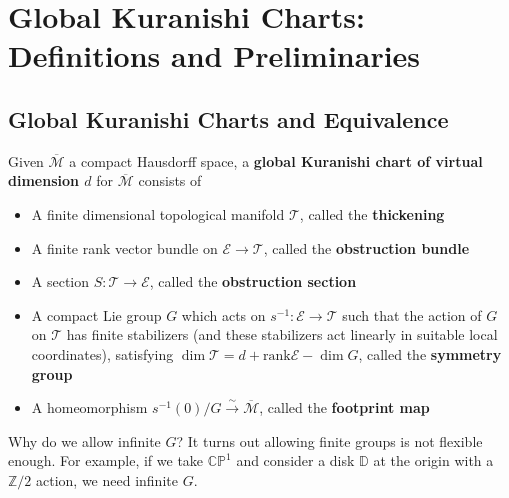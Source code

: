 \chapter{Global Kuranishi Charts: Definitions and Preliminaries}
\label{s2}
\section{Global Kuranishi Charts and Equivalence}

\begin{definition}

Given $\overline{\mathcal{M}}$ a compact Hausdorff space, a \textbf{global Kuranishi chart of virtual dimension $d$} for $\overline{\mathcal{M}}$ consists of
\begin{itemize}
\item A finite dimensional topological manifold $\mathcal{T}$, called the \textbf{thickening}
\item A finite rank vector bundle on $\mathcal{E}\to \mathcal{T}$, called the \textbf{obstruction bundle}
\item A section $S: \mathcal{T}\to \mathcal{E}$, called the \textbf{obstruction section}
\item A compact Lie group $G$ which acts on $s^{-1}: \mathcal{E}\to \mathcal{T}$ such that the action of $G$ on $\mathcal{T}$ has finite stabilizers (and these stabilizers act linearly in suitable local coordinates), satisfying $\dim \mathcal{T}= d+ \text{rank} \mathcal{E} - \dim G$, called the \textbf{symmetry group}
\item A homeomorphism $s^{-1}(0)/G \stackrel{\sim}{\longrightarrow} \overline{\mathcal{M}}$, called the \textbf{footprint map}
\end{itemize}

\end{definition}

Why do we allow infinite $G$? It turns out allowing finite groups is not flexible enough. For example, if we take $\mathbb{CP}^1$ and consider a disk $\mathbb{D}$ at the origin with a $\mathbb{Z}/2$ action, we need infinite $G$.

